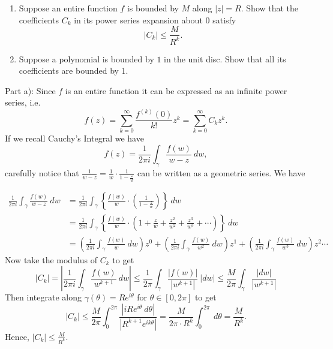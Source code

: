 \documentclass[12pt]{article}
\newenvironment{solution}[2][Solution]{\begin{trivlist}
\item[\hskip \labelsep {\bfseries #1}]}{\end{trivlist}}
\newenvironment{problem}[2][Problem]{\begin{trivlist}
\item[\hskip \labelsep {\bfseries #1}\hskip \labelsep {\bfseries #2.}]}{\end{trivlist}}
\begin{document}


\newpage
\begin{problem}{6}
\begin{enumerate}[label=\alph*)]
    \item Suppose an entire function $f$ is bounded by $M$ along $|z|=R$. Show that the coefficients $C_k$ in its power series expansion about $0$ satisfy
    \[
    |C_k|\leq\frac{M}{R^k}.
    \]
    \item Suppose a polynomial is bounded by $1$ in the unit disc. Show that all its coefficients are bounded by 1.
\end{enumerate}
\end{problem}

\begin{solution}{}
Part a): Since $f$ is an entire function it can be expressed as an infinite power series, i.e.
\[
f(z)=\sum_{k=0}^\infty\frac{f^{(k)}(0)}{k!}z^k=\sum_{k=0}^\infty C_kz^k.
\]
If we recall Cauchy's Integral we have
\[
f(z)=\frac{1}{2\pi i}\int_\gamma\frac{f(w)}{w-z}\ dw,
\]
carefully notice that $\frac{1}{w-z}=\frac{1}{w}\cdot\frac{1}{1-\frac{z}{w}}$ can be written as a geometric series. We have

\begin{align*}
\frac{1}{2\pi i}\int_\gamma\frac{f(w)}{w-z}\ dw &=\frac{1}{2\pi i}\int_\gamma\left\lbrace\frac{f(w)}{w}\cdot\left(\frac{1}{1-\frac{z}{w}}\right) \right\rbrace\ dw\\[8pt]
&=\frac{1}{2\pi i}\int_\gamma\left\lbrace\frac{f(w)}{w}\cdot\left(1+\frac{z}{w}+\frac{z^2}{w^2}+\frac{z^3}{w^3}+\cdots\right) \right\rbrace\ dw\\[8pt]
&=\left(\frac{1}{2\pi i}\int_\gamma \frac{f(w)}{w}\ dw\right)z^0+\left(\frac{1}{2\pi i}\int_\gamma \frac{f(w)}{w^2}\ dw\right)z^1+\left(\frac{1}{2\pi i}\int_\gamma \frac{f(w)}{w^3}\ dw\right)z^2\cdots
\end{align*}
Now take the modulus of $C_k$ to get
\[
|C_k|=\left\lvert\frac{1}{2\pi i}\int_\gamma \frac{f(w)}{w^{k+1}}\ dw \right\rvert\leq\frac{1}{2\pi}\int_\gamma\frac{|f(w)|}{|w^{k+1}|}\ |dw|\leq \frac{M}{2\pi}\int_\gamma\frac{|dw|}{|w^{k+1}|}
\]
Then integrate along $\gamma(\theta)=Re^{i\theta}$ for $\theta\in [0,2\pi]$ to get
\[
|C_k|\leq \frac{M}{2\pi}\int_0^{2\pi}\frac{|iRe^{i\theta}\ d\theta|}{|R^{k+1}e^{ik\theta}|}=\frac{M}{2\pi\cdot R^k}\int_0^{2\pi}\ d\theta=\frac{M}{R^k}.
\]
Hence, $|C_k|\leq \frac{M}{R^k}$.
\end{solution}
\pagebreak



\printindex
\end{document}
